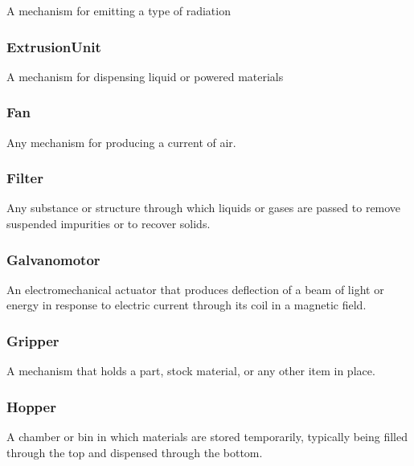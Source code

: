 A mechanism for emitting a type of radiation


\subsubsection{ExtrusionUnit}
\label{sec:ExtrusionUnit}



A mechanism for dispensing liquid or powered materials


\subsubsection{Fan}
\label{sec:Fan}



Any mechanism for producing a current of air.


\subsubsection{Filter}
\label{sec:Filter}



Any substance or structure through which liquids or gases are passed to remove suspended impurities or to recover solids.


\subsubsection{Galvanomotor}
\label{sec:Galvanomotor}



An electromechanical actuator that produces deflection of a beam of light or energy in response to electric current through its coil in a magnetic field.


\subsubsection{Gripper}
\label{sec:Gripper}



A mechanism that holds a part, stock material, or any other item in place.


\subsubsection{Hopper}
\label{sec:Hopper}



A chamber or bin in which materials are stored temporarily, typically being filled through the top and dispensed through the bottom.


